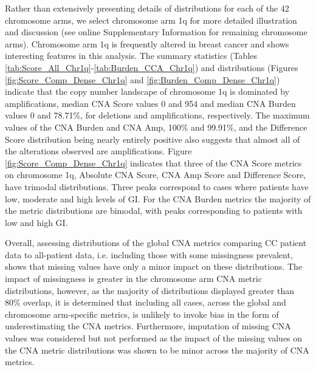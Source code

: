 Rather than extensively presenting details of distributions for each of the 42 chromosome arms, we select chromosome arm 1q for more detailed illustration and discussion (see online Supplementary Information for remaining chromosome arms). Chromosome arm 1q is frequently altered in breast cancer and shows interesting features in this analysis. The summary statistics (Tables \ref{tab:Score_All_Chr1q}-\ref{tab:Burden_CCA_Chr1q}) and distributions (Figures \ref{fig:Score_Comp_Dense_Chr1q} and \ref{fig:Burden_Comp_Dense_Chr1q}) indicate that the copy number landscape of chromosome 1q is dominated by amplifications, median CNA Score values 0 and 954 and median CNA Burden values 0 and 78.71\%, for deletions and amplifications, respectively. The maximum values of the CNA Burden and CNA Amp, 100\% and 99.91\%, and the Difference Score distribution being nearly entirely positive also suggests that almost all of the alterations observed are amplifications. Figure \ref{fig:Score_Comp_Dense_Chr1q} indicates that three of the CNA Score metrics on chromosome 1q, Absolute CNA Score, CNA Amp Score and Difference Score, have trimodal distributions. Three peaks correspond to cases where patients have low, moderate and high levels of GI. For the CNA Burden metrics the majority of the metric distributions are bimodal, with peaks corresponding to patients with low and high GI. 

Overall, assessing distributions of the global CNA metrics comparing CC patient data to all-patient data, i.e. including those with some missingness prevalent, shows that missing values have only a minor impact on these distributions. The impact of missingness is greater in the chromosome arm CNA metric distributions, however, as the majority of distributions displayed greater than 80\% overlap, it is determined that including all cases, across the global and chromosome arm-specific metrics, is unlikely to invoke bias in the form of underestimating the CNA metrics. Furthermore, imputation of missing CNA values was considered but not performed as the impact of the missing values on the CNA metric distributions was shown to be minor across the majority of CNA metrics.

